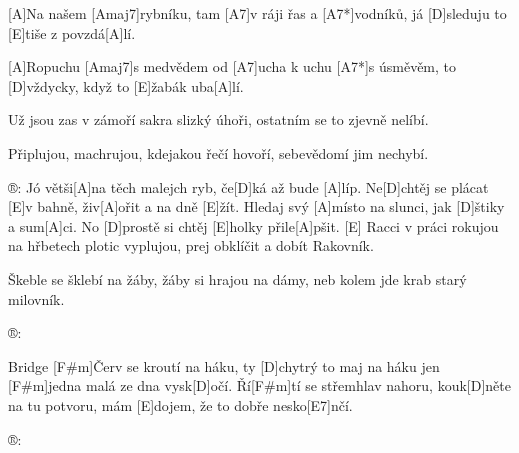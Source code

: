 
[A]Na našem [Amaj7]rybníku,
tam [A7]v ráji řas a [A7*]vodníků,
já [D]sleduju to [E]tiše z povzdá[A]lí.

[A]Ropuchu [Amaj7]s medvědem
od [A7]ucha k uchu [A7*]s úsměvěm,
to [D]vždycky, když to [E]\null žabák uba[A]lí.

Už jsou zas v zámoří
sakra slizký úhoři,
ostatním se to zjevně nelíbí.

Připlujou, machrujou,
kdejakou řečí hovoří,
sebevědomí jim nechybí.

®: Jó větši[A]na těch malejch ryb,
če[D]ká až bude [A]líp.
Ne[D]chtěj se plácat [E]v bahně, živ[A]ořit
a na dně [E]\null žít.
Hledaj svý [A]místo na slunci,
jak [D]\null štiky a sum[A]ci.
No [D]prostě si chtěj [E]holky přile[A]pšit. [E]
\slpc
Racci v práci rokujou
na hřbetech plotic vyplujou,
prej obklíčit a dobít Rakovník.

Škeble se šklebí na žáby,
žáby si hrajou na dámy,
neb kolem jde krab starý milovník.

®:

{Bridge}
[F#m]\null Červ se kroutí na háku,
ty [D]chytrý to maj na háku
jen [F#m]jedna malá ze dna vysk[D]očí.
Ří[F#m]tí se střemhlav nahoru,
kouk[D]něte na tu potvoru,
mám [E]dojem, že to dobře nesko[E7]nčí.

®:



